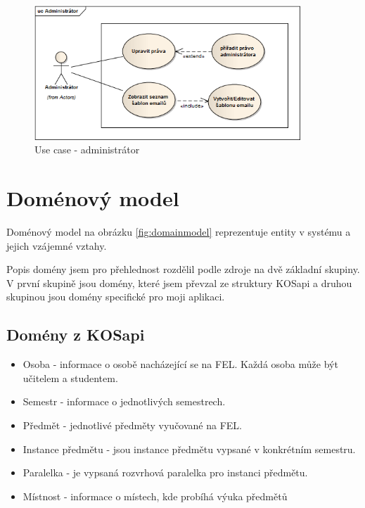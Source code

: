 \begin{figure}[H]
\begin{center}
\includegraphics[width=10cm]{figures/actor_root}
\caption{Use case - administrátor}
\label{fig:actor_root}
\end{center}
\end{figure}

\newpage 
\section{Doménový model}
Doménový model na obrázku \ref{fig:domainmodel} reprezentuje entity v systému a jejich vzájemné vztahy. 

Popis domény jsem pro přehlednost rozdělil podle zdroje na dvě základní skupiny. V první skupině jsou domény, které jsem převzal ze struktury KOSapi a druhou skupinou jsou domény specifické pro moji aplikaci. 

\label{sec:domeny_kosapi} 
\subsection{Domény z KOSapi}
\begin{itemize}
\item Osoba - informace o osobě nacházející se na FEL. Každá osoba může být učitelem a studentem.
\item Semestr - informace o jednotlivých semestrech. 
\item Předmět - jednotlivé předměty vyučované na FEL.
\item Instance předmětu - jsou instance předmětu vypsané v konkrétním semestru.
\item Paralelka - je vypsaná rozvrhová paralelka pro instanci předmětu.
\item Místnost - informace o místech, kde probíhá výuka předmětů
\end{itemize}

